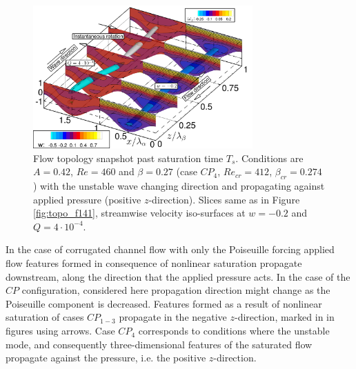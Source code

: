 \documentclass[lineno]{jfm}
\begin{document}
\begin{figure}
\centering
    \includegraphics[width=0.75\textwidth]{figure16.png}
	\caption{Flow topology snapshot past saturation time $T_s$. Conditions are
$A=0.42$, $Re=460$ and $\beta=0.27$ (case $CP_4$, $Re_{cr}=412$, $\beta_{cr}=0.274$) with the unstable wave changing direction and propagating against applied pressure (positive $z$-direction).
Slices same as in Figure \ref{fig:topo_f141},
streamwise velocity iso-surfaces at $w=-0.2$ and $Q=4\cdot10^{-4}$.}
	\label{fig:topo_f084}
\end{figure}

In the case of corrugated channel flow with only the Poiseuille forcing applied \citep{Nikesh2017,Nikesh2021} flow features formed in consequence of nonlinear saturation propagate downstream, along the direction that the applied pressure acts.
In the case of the $CP$ configuration, considered here propagation direction might change as the Poiseuille component is decreased.
Features formed as a result of nonlinear saturation of cases $CP_{1-3}$ propagate in the negative $z$-direction, marked in in figures using arrows.
Case $CP_4$ corresponds to conditions where the unstable mode, and consequently three-dimensional features of the saturated flow propagate against the pressure, i.e. the positive $z$-direction.
\end{document}
